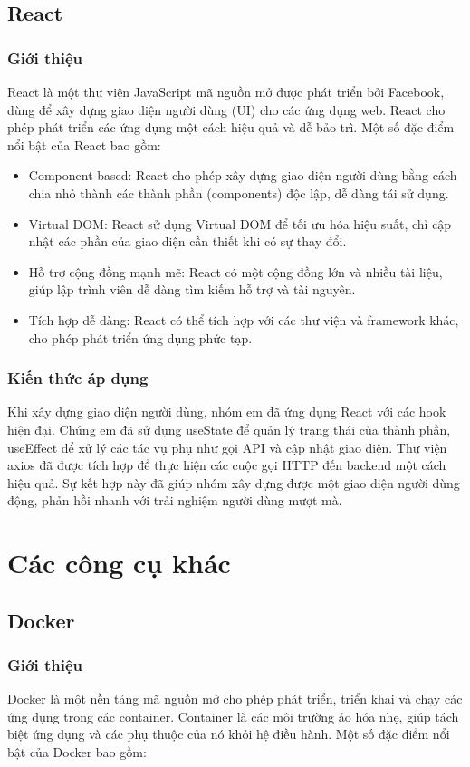 \documentclass[../BTL.tex]{subfiles}
\begin{document}
\subsection{React}
\subsubsection{ Giới thiệu}
React là một thư viện JavaScript mã nguồn mở được phát triển bởi Facebook, dùng để xây dựng giao diện người dùng (UI) cho các ứng dụng web. React cho phép phát triển các ứng dụng một cách hiệu quả và dễ bảo trì. Một số đặc điểm nổi bật của React bao gồm:

\begin{itemize}
    \item Component-based: React cho phép xây dựng giao diện người dùng bằng cách chia nhỏ thành các thành phần (components) độc lập, dễ dàng tái sử dụng.
    \item Virtual DOM: React sử dụng Virtual DOM để tối ưu hóa hiệu suất, chỉ cập nhật các phần của giao diện cần thiết khi có sự thay đổi.
    \item Hỗ trợ cộng đồng mạnh mẽ: React có một cộng đồng lớn và nhiều tài liệu, giúp lập trình viên dễ dàng tìm kiếm hỗ trợ và tài nguyên.
    \item Tích hợp dễ dàng: React có thể tích hợp với các thư viện và framework khác, cho phép phát triển ứng dụng phức tạp.
\end{itemize}
\subsubsection{ Kiến thức áp dụng}
Khi xây dựng giao diện người dùng, nhóm em đã ứng dụng React với các hook hiện đại. Chúng em đã sử dụng useState để quản lý trạng thái của thành phần, useEffect để xử lý các tác vụ phụ như gọi API và cập nhật giao diện. Thư viện axios đã được tích hợp để thực hiện các cuộc gọi HTTP đến backend một cách hiệu quả. Sự kết hợp này đã giúp nhóm xây dựng được một giao diện người dùng động, phản hồi nhanh với trải nghiệm người dùng mượt mà.
\section{ Các công cụ khác}
\subsection{Docker}
\subsubsection{ Giới thiệu}
Docker là một nền tảng mã nguồn mở cho phép phát triển, triển khai và chạy các ứng dụng trong các container. Container là các môi trường ảo hóa nhẹ, giúp tách biệt ứng dụng và các phụ thuộc của nó khỏi hệ điều hành. Một số đặc điểm nổi bật của Docker bao gồm:
\end{document}
